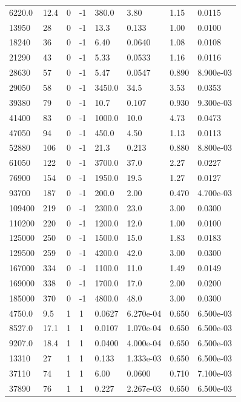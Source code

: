 \documentclass[preview]{standalone}
\begin{document}
{{\begin{tabular}{L{1.2cm}C{1.2cm} C{0.3cm}C{0.5cm} C{1.4cm}C{1.4cm} C{1.4cm}C{1.4cm}}
  6220.0  &  12.4  & 0     & -1 &  380.0  & 3.80  & 1.15 &  0.0115   \\ 
  13950  &    28  & 0     & -1 &  13.3  & 0.133  & 1.00 &  0.0100   \\ 
  18240  &    36  & 0     & -1 &  6.40  & 0.0640  & 1.08 &  0.0108   \\ 
  21290  &    43  & 0     & -1 &  5.33  & 0.0533  & 1.16 &  0.0116   \\ 
  28630  &    57  & 0     & -1 &  5.47  & 0.0547  & 0.890 &  8.900e-03   \\ 
  29050  &    58  & 0     & -1 &  3450.0  & 34.5  & 3.53 &  0.0353   \\ 
  39380  &    79  & 0     & -1 &  10.7  & 0.107  & 0.930 &  9.300e-03   \\ 
  41400  &    83  & 0     & -1 &  1000.0  & 10.0  & 4.73 &  0.0473   \\ 
  47050  &    94  & 0     & -1 &  450.0  & 4.50  & 1.13 &  0.0113   \\ 
  52880  &   106  & 0     & -1 &  21.3  & 0.213  & 0.880 &  8.800e-03   \\ 
  61050  &   122  & 0     & -1 &  3700.0  & 37.0  & 2.27 &  0.0227   \\ 
  76900  &   154  & 0     & -1 &  1950.0  & 19.5  & 1.27 &  0.0127   \\ 
  93700  &   187  & 0     & -1 &  200.0  & 2.00  & 0.470 &  4.700e-03   \\ 
  109400  &   219  & 0     & -1 &  2300.0  & 23.0  & 3.00 &  0.0300   \\ 
  110200  &   220  & 0     & -1 &  1200.0  & 12.0  & 1.00 &  0.0100   \\ 
  125000  &   250  & 0     & -1 &  1500.0  & 15.0  & 1.83 &  0.0183   \\ 
  129500  &   259  & 0     & -1 &  4200.0  & 42.0  & 3.00 &  0.0300   \\ 
  167000  &   334  & 0     & -1 &  1100.0  & 11.0  & 1.49 &  0.0149   \\ 
  169000  &   338  & 0     & -1 &  1700.0  & 17.0  & 2.00 &  0.0200   \\ 
  185000  &   370  & 0     & -1 &  4800.0  & 48.0  & 3.00 &  0.0300   \\ 
  4750.0  &   9.5  & 1     &  1 &  0.0627  & 6.270e-04  & 0.650 &  6.500e-03   \\ 
  8527.0  &  17.1  & 1     &  1 &  0.0107  & 1.070e-04  & 0.650 &  6.500e-03   \\ 
  9207.0  &  18.4  & 1     &  1 &  0.0400  & 4.000e-04  & 0.650 &  6.500e-03   \\ 
  13310  &    27  & 1     &  1 &  0.133  & 1.333e-03  & 0.650 &  6.500e-03   \\ 
  37110  &    74  & 1     &  1 &  6.00  & 0.0600  & 0.710 &  7.100e-03   \\ 
  37890  &    76  & 1     &  1 &  0.227  & 2.267e-03  & 0.650 &  6.500e-03   \\ 
\hline 
\end{tabular} 

}}
\end{document}

